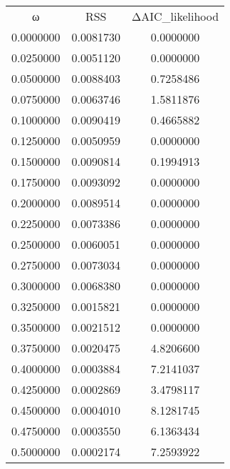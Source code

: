 \begin{tabular}{ccc}
ω & RSS & ΔAIC_likelihood\\
0.0000000 & 0.0081730 & 0.0000000\\
0.0250000 & 0.0051120 & 0.0000000\\
0.0500000 & 0.0088403 & 0.7258486\\
0.0750000 & 0.0063746 & 1.5811876\\
0.1000000 & 0.0090419 & 0.4665882\\
0.1250000 & 0.0050959 & 0.0000000\\
0.1500000 & 0.0090814 & 0.1994913\\
0.1750000 & 0.0093092 & 0.0000000\\
0.2000000 & 0.0089514 & 0.0000000\\
0.2250000 & 0.0073386 & 0.0000000\\
0.2500000 & 0.0060051 & 0.0000000\\
0.2750000 & 0.0073034 & 0.0000000\\
0.3000000 & 0.0068380 & 0.0000000\\
0.3250000 & 0.0015821 & 0.0000000\\
0.3500000 & 0.0021512 & 0.0000000\\
0.3750000 & 0.0020475 & 4.8206600\\
0.4000000 & 0.0003884 & 7.2141037\\
0.4250000 & 0.0002869 & 3.4798117\\
0.4500000 & 0.0004010 & 8.1281745\\
0.4750000 & 0.0003550 & 6.1363434\\
0.5000000 & 0.0002174 & 7.2593922\\
\end{tabular}
